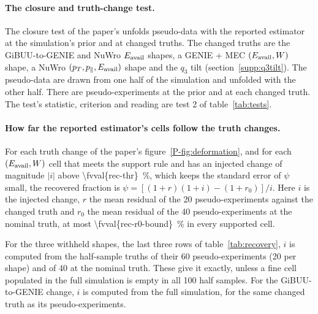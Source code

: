 \paragraph{The closure and truth-change test.} The closure test of the paper's  unfolds pseudo-data with the reported estimator at the simulation's prior and at changed truths. The changed truths are the GiBUU-to-GENIE and NuWro $E_{\mathrm{avail}}$ shapes, a GENIE + MEC $(E_{\mathrm{avail}},W)$ shape, a NuWro $(p_{T},p_{\parallel},E_{\mathrm{avail}})$ shape and the $q_3$ tilt (section~\ref{supp:q3tilt}). The pseudo-data are drawn from one half of the simulation and unfolded with the other half. There are  pseudo-experiments at the prior and  at each changed truth. The test's statistic, criterion and reading are test 2 of table~\ref{tab:tests}.

\paragraph{How far the reported estimator's cells follow the truth changes.}
\label{supp:recovery}
For each truth change of the paper's figure~\ref*{P-fig:deformation}, and for each $(E_{\mathrm{avail}},W)$ cell that meets the support rule and has an injected change of magnitude $|i|$ above \SI{\fvval{rec-thr}}{\percent}, which keeps the standard error of $\psi$ small, the recovered fraction is $\psi=[(1+r)(1+i)-(1+r_{0})]/i$. Here $i$ is the injected change, $r$ the mean residual of the 20 pseudo-experiments against the changed truth and $r_{0}$ the mean residual of the 40 pseudo-experiments at the nominal truth, at most \SI{\fvval{rec-r0-bound}}{\percent} in every supported cell.

For the three withheld shapes, the last three rows of table~\ref{tab:recovery}, $i$ is computed from the half-sample truths of their 60 pseudo-experiments (20 per shape) and of 40 at the nominal truth. These give it exactly, unless a fine cell populated in the full simulation is empty in all 100 half samples. For the GiBUU-to-GENIE change, $i$ is computed from the full simulation, for the same changed truth as its pseudo-experiments.

